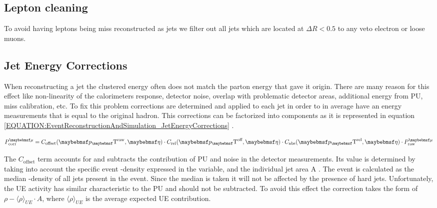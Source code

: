 \subsection{Lepton cleaning}
\label{SECTION:EventReconstructionAndSimulation_Jets_LeptonCleaning}


To avoid having leptons being miss reconstructed as jets we filter out all jets which are located at $\Delta R < 0.5$ to any veto electron or loose muons.

\subsection{Jet Energy Corrections}
\label{SECTION:EventReconstructionAndSimulation_Jets_JetEnergyCorrections}


When reconstructing a jet the clustered energy often does not match the parton energy that gave it origin. There are many reason for this effect like non-linearity of the calorimeters response, detector noise, overlap with problematic detector areas, additional energy from \gls{PU}, miss calibration, etc. To fix this problem corrections are determined and applied to each jet in order to in average have an energy measurements that is equal to the original hadron. This corrections can be factorized into components as it is represented in equation \ref{EQUATION:EventReconstructionAndSimulation_JetEnergyCorrections} \cite{ARTICLE:CMSDeterminationJetEnergyCalibration}.

\begin{equation}
P_{\text{corr}}^{\mu} = C_{\text{offset}}(\pT^{\text{raw}},\eta) \cdot C_{\text{rel}}(\pT^{\text{off}},\eta) \cdot C_{\text{abs}}(\pT^{\text{rel}},\eta) \cdot P_{\text{raw}}^{\mu}
\label{EQUATION:EventReconstructionAndSimulation_JetEnergyCorrections}
\end{equation}

The $C_{\text{offset}}$ term accounts for and subtracts the contribution of \gls{PU} and noise in the detector measurements. Its value is determined by taking into account the specific event \pt-density expressed in the \rho variable, and the individual jet area A \cite{ARTICLE:PileupSubtractionJetAreas}. The event \rho is calculated as the median \pt-density of all jets present in the event. Since the median is taken it will not be affected by the presence of hard jets. Unfortunately, the \gls{UE} activity has similar characteristic to the \gls{PU} and should not be subtracted. To avoid this effect the correction takes the form of $\rho - \langle \rho \rangle_{UE} \cdot A$, where $\langle \rho \rangle_{UE}$ is the average expected \gls{UE} contribution.

